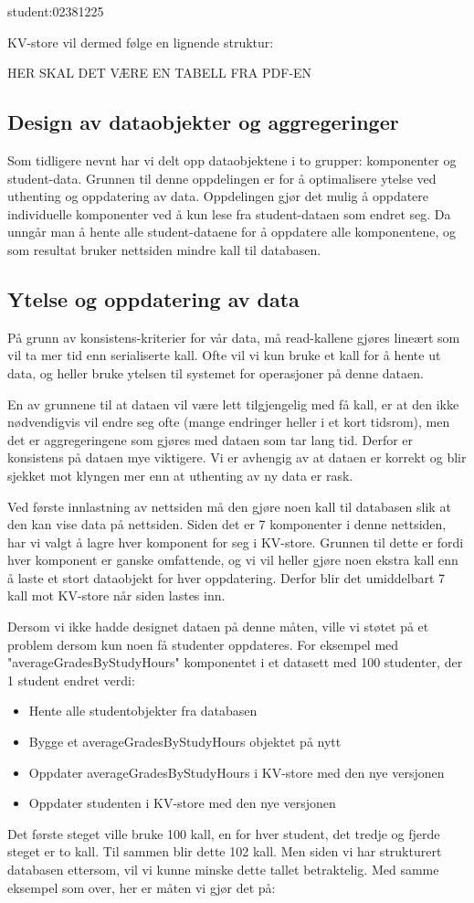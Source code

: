   student:02381225

KV-store vil dermed følge en lignende struktur:

HER SKAL DET VÆRE EN TABELL FRA PDF-EN

\subsection{Design av dataobjekter og aggregeringer}
Som tidligere nevnt har vi delt opp dataobjektene i to grupper: komponenter og student-data. Grunnen til denne oppdelingen er for å optimalisere ytelse ved uthenting og oppdatering av data. Oppdelingen gjør det mulig å oppdatere individuelle komponenter ved å kun lese fra student-dataen som endret seg. Da unngår man å hente alle student-dataene for å oppdatere alle komponentene, og som resultat bruker nettsiden mindre kall til databasen.

\subsection{Ytelse og oppdatering av data}
På grunn av konsistens-kriterier for vår data, må read-kallene gjøres lineært som vil ta mer tid enn serialiserte kall. Ofte vil vi kun bruke et kall for å hente ut data, og heller bruke ytelsen til systemet for operasjoner på denne dataen.

En av grunnene til at dataen vil være lett tilgjengelig med få kall, er at den ikke nødvendigvis vil endre seg ofte (mange endringer heller i et kort tidsrom), men det er aggregeringene som gjøres med dataen som tar lang tid. Derfor er konsistens på dataen mye viktigere. Vi er avhengig av at dataen er korrekt og blir sjekket mot klyngen mer enn at uthenting av ny data er rask.

Ved første innlastning av nettsiden må den gjøre noen kall til databasen slik at den kan vise data på nettsiden. Siden det er 7 komponenter i denne nettsiden, har vi valgt å lagre hver komponent for seg i KV-store. Grunnen til dette er fordi hver komponent er ganske omfattende, og vi vil heller gjøre noen ekstra kall enn å laste et stort dataobjekt for hver oppdatering. Derfor blir det umiddelbart 7 kall mot KV-store når siden lastes inn.

Dersom vi ikke hadde designet dataen på denne måten, ville vi støtet på et problem dersom kun noen få studenter oppdateres. For eksempel med "averageGradesByStudyHours" komponentet i et datasett med 100 studenter, der 1 student endret verdi:

\begin{itemize}
  \item Hente alle studentobjekter fra databasen
  \item Bygge et averageGradesByStudyHours objektet på nytt
  \item Oppdater averageGradesByStudyHours i KV-store med den nye versjonen
  \item Oppdater studenten i KV-store med den nye versjonen
\end{itemize}

Det første steget ville bruke 100 kall, en for hver student, det tredje og fjerde steget er to kall. Til sammen blir dette 102 kall. Men siden vi har strukturert databasen ettersom, vil vi kunne minske dette tallet betraktelig. Med samme eksempel som over, her er måten vi gjør det på:
